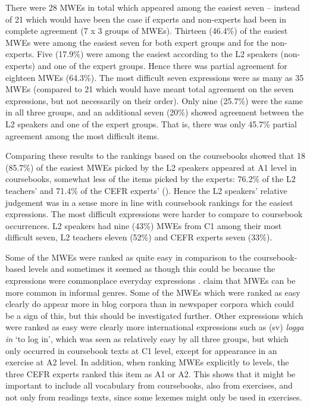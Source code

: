 \documentclass[output=paper,colorlinks,citecolor=brown]{langscibook}
\begin{document}
There were 28 MWEs in total which appeared among the easiest seven – instead of 21 which would have been the case if experts and non-experts had been in complete agreement (7 x 3 groups of MWEs). Thirteen (46.4\%) of the easiest MWEs were among the easiest seven for both expert groups and for the non-experts. Five (17.9\%) were among the easiest according to the L2 speakers (non-experts) and one of the expert groups. Hence there was partial agreement for eighteen MWEs (64.3\%). The most difficult seven expressions were as many as 35 MWEs (compared to 21 which would have meant total agreement on the seven expressions, but not necessarily on their order). Only nine (25.7\%) were the same in all three groups, and an additional seven (20\%) showed agreement between the L2 speakers and one of the expert groups. That is, there was only 45.7\% partial agreement among the most difficult items.

Comparing these results to the rankings based on the coursebooks showed that 18 (85.7\%) of the easiest MWEs picked by the L2 speakers appeared at A1 level in coursebooks, somewhat less of the items picked by the experts: 76.2\% of the L2 teachers’ and 71.4\% of the CEFR experts’ (\cite{lindstrom2022MWE}). Hence the L2 speakers’ relative judgement was in a sense more in line with coursebook rankings for the easiest expressions. The most difficult expressions were harder to compare to coursebook occurrences. L2 speakers had nine (43\%) MWEs from C1 among their most difficult seven, L2 teachers eleven (52\%) and CEFR experts seven (33\%).

Some of the MWEs were ranked as quite easy in comparison to the coursebook-based levels and sometimes it seemed as though this could be because the expressions were commonplace everyday expressions \citep{lindstrom2022MWE}. \citet{prentice2013flerordsenheter} claim that MWEs can be more common in informal genres. Some of the MWEs which were ranked as easy clearly do appear more in blog corpora than in newspaper corpora \citep{lindstrom2022MWE} which could be a sign of this, but this should be investigated further. Other expressions which were ranked as easy were clearly more international expressions such as (sv) \textit{logga in} `to log in', which was seen as relatively easy by all three groups, but which only occurred in coursebook texts at C1 level, except for appearance in an exercise at A2 level. In addition, when ranking MWEs explicitly to levels, the three CEFR experts ranked this item as A1 or A2. This shows that it might be important to include all vocabulary from coursebooks, also from exercises, and not only from readings texts, since some lexemes might only be used in exercises.  
\end{document}
